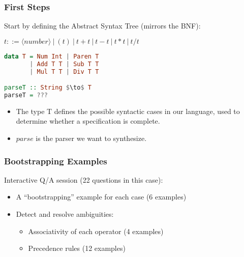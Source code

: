 \begin{frame}[fragile]
\frametitle{First Steps}

  Start by defining the Abstract Syntax Tree (mirrors the BNF):

\begin{center}
\begin{minipage}{.7\textwidth}
$t ::= \langle number \rangle ~|~ ( t ) ~|~ t + t ~|~ t - t ~|~ t * t ~|~ t / t$

\begin{lstlisting}[mathescape,language=haskell]
data T = Num Int | Paren T
       | Add T T | Sub T T
       | Mul T T | Div T T

parseT :: String $\to$ T
parseT = ???
\end{lstlisting}
\end{minipage}
\end{center}

\begin{itemize}
\item{The type T defines the possible syntactic cases in our language,
    used to determine whether a specification is complete.}
\item{$parse$ is the parser we want to synthesize.}
\end{itemize}
\end{frame}

\begin{frame}[fragile]
\frametitle{Bootstrapping Examples}
  Interactive Q/A session (22 questions in this case):

\begin{itemize}
  \item A ``bootstrapping'' example for each case (6 examples)
  \item {Detect and resolve ambiguities:
    \begin{itemize}
      \item Associativity of each operator (4 examples)
      \item Precedence rules (12 examples)
    \end{itemize}
  }
\end{itemize}

\end{frame}

